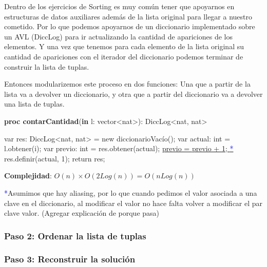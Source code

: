 \documentclass{article}
\newcommand{\Complexity}[1]{\textbf{Complejidad}: #1}
\begin{document}
Dentro de los ejercicios de Sorting es muy común tener que apoyarnos en estructuras de datos auxiliares además de la lista original para llegar a nuestro cometido. Por lo que podemos apoyarnos de un diccionario implementado sobre un AVL (DiccLog) para ir actualizando la cantidad de apariciones de los elementos. Y una vez que tenemos para cada elemento de la lista original su cantidad de apariciones con el iterador del diccionario podemos terminar de construir la lista de tuplas.

Entonces modularizemos este proceso en dos funciones: Una que a partir de la lista va a devolver un diccionario, y otra que a partir del diccionario va a devolver una lista de tuplas. 
\begin{algorithm}[H]
    \caption{
        \textbf{proc contarCantidad}(\textbf{in} l: \textnormal{vector\textless{}nat\textgreater{}}): \textnormal{DiccLog\textless{}nat, nat\textgreater{}}
    }
    \begin{algorithmic}[1]
        \State var res: \textnormal{DiccLog\textless{}nat, nat\textgreater{}} = new diccionarioVacío();  
         
            \State var actual: int = l.obtener(i); 
             
                \State var previo: int = res.obtener(actual); 
                \State \hyperref[sec:explanation]{previo = previo + 1; \textcolor{blue}{*}}
            \Else
                \State res.definir(actual, 1); 
            \EndIf 
        \EndFor
    \State return res;
    \end{algorithmic}
    \Complexity{$O(n) \times O(2Log(n)) = O(nLog(n))$}
\end{algorithm}

\label{sec:explanation}
\textcolor{blue}{*}Asumimos que hay aliasing, por lo que cuando pedimos el valor asociada a una clave en el diccionario, al modificar el valor no hace falta volver a modificar el par clave valor. (Agregar explicación de porque pasa)
\subsubsection*{Paso 2: Ordenar la lista de tuplas}
\subsubsection*{Paso 3: Reconstruir la solución}
\end{document}
